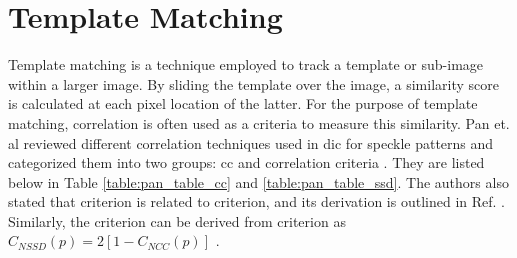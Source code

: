 



    \section{Template Matching}\label{section:template_matching}
    Template matching is a technique employed to track a template or sub-image within a larger image. By sliding the template over the image, a similarity score is calculated at each pixel location of the latter. For the purpose of template matching, correlation is often used as a criteria to measure this similarity. Pan et. al reviewed different correlation techniques used in \gls{dic} for speckle patterns and categorized them into two groups: \gls{cc} and  correlation criteria \cite{pan_review}. They are listed below in Table \ref{table:pan_table_cc} and \ref{table:pan_table_ssd}. The authors also stated that  criterion is related to  criterion, and its derivation is outlined in Ref. \cite{pan_derivation}. Similarly, the  criterion can be derived from  criterion as \( C_{NSSD}(p) = 2[1 - C_{NCC}(p)] \) \cite{pan_review}.

